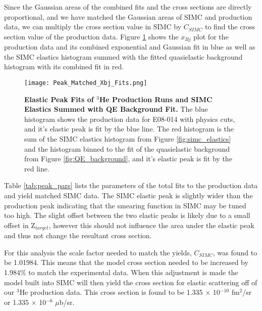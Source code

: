 Since the Gaussian areas of the combined fits and the cross sections are directly proportional, and we have matched the Gaussian areas of SIMC and production data, we can multiply the cross section value in SIMC by $C_{SIMC}$ to find the cross section value of the production data. Figure \ref{fig:final_xs} shows the $x_{Bj}$ plot for the production data and its combined exponential and Gaussian fit in blue as well as the SIMC elastics histogram summed with the fitted quasielastic background histogram with its combined fit in red. 

\begin{figure}[!ht]
\begin{center}
\texttt{[image: Peak\_Matched\_Xbj\_Fits.png]}
\end{center}
\caption[Elastic Peak Fits of $^{3}$He Production Runs and SIMC Elastics Summed with QE Background Fit]{
{\bf{Elastic Peak Fits of $^{3}$He Production Runs and SIMC Elastics Summed with QE Background Fit.}} The blue histogram shows the production data for E08-014 with physics cuts, and it's elastic peak is fit by the blue line. The red histogram is the sum of the SIMC elastics histogram from Figure \ref{fig:simc_elastics} and the histogram binned to the fit of the quasielastic background from Figure \ref{fig:QE_background}, and it's elastic peak is fit by the red line.}
\label{fig:final_xs}
\end{figure}

Table \ref{tab:peak_pars} lists the parameters of the total fits to the production data and yield matched SIMC data. The SIMC elastic peak is slightly wider than the production peak indicating that the smearing function in SIMC may be tuned too high. The slight offset between the two elastic peaks is likely due to a small offset in Z$_{target}$, however this should not influence the area under the elastic peak and thus not change the resultant cross section. 

For this analysis the scale factor needed to match the yields, $C_{SIMC}$, was found to be 1.01984. This means that the model cross section needed to be increased by 1.984$\%$ to match the experimental data. When this adjustment is made the model built into SIMC will then yield the cross section for elastic scattering off of our $^3$He production data. This cross section is found to be 1.335 $\times$ 10$^{-10}$ fm$^2$/sr or 1.335 $\times$ 10$^{-6}$ $\mu$b/sr.

\vspace{5mm}


